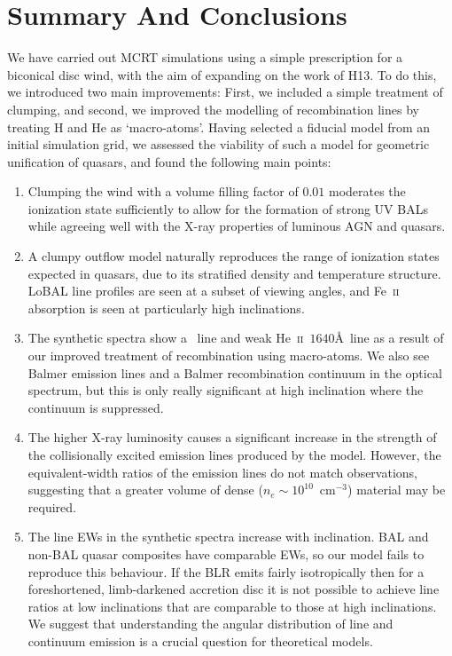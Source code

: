 \documentclass[useAMS,usenatbib]{mn2e_x}
\begin{document}
\section{Summary And Conclusions}

We have carried out MCRT simulations using a simple
prescription for a biconical disc wind, with
the aim of expanding on the work of H13. To do this, we introduced two main
improvements: First, we included a simple treatment of clumping, and second, 
we improved the modelling of recombination lines by treating H and He as
`macro-atoms'. Having selected a fiducial model from an initial simulation grid,
we assessed the viability of such a model for geometric 
unification of quasars, and found the following main points:
\begin{enumerate}
\item Clumping the wind with a volume filling factor of $0.01$ 
moderates the ionization state
sufficiently to allow for the 
formation of strong UV BALs while agreeing well with the X-ray
properties of luminous AGN and quasars. 
\smallskip
\item A clumpy outflow model naturally 
reproduces the range of ionization states
expected in quasars, due to its stratified density
and temperature structure. 
LoBAL line profiles are seen at a subset of viewing angles, and Fe~\textsc{ii}
absorption is seen at particularly high inclinations. 
\smallskip
\item The synthetic spectra show a \la\ line and weak He~\textsc{ii}~$1640$\AA\ line
as a result of our improved treatment of recombination using macro-atoms. We also see
Balmer emission lines and a Balmer recombination continuum in the optical spectrum, but this
is only really significant at high inclination where the continuum is suppressed.  
\smallskip
\item The higher X-ray luminosity causes a significant 
increase in the strength of the collisionally excited emission
lines produced by the model. 
However, the equivalent-width ratios of the emission lines do not match
observations, suggesting that a greater volume of dense ($n_e\sim10^{10}$~cm$^{-3}$)
material may be required.
\smallskip
\item The line EWs in the synthetic spectra increase with inclination.
BAL and non-BAL quasar composites have comparable EWs, so our model
fails to reproduce this behaviour.
 If the BLR emits fairly isotropically then for a 
foreshortened, limb-darkened accretion disc 
it is not possible to achieve line ratios at low inclinations 
that are comparable to those at high inclinations. 
We suggest that understanding the angular distribution of 
line and continuum emission is a crucial question for theoretical models.
\end{enumerate}
\end{document}
